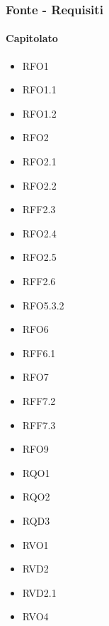 \subsubsection{Fonte - Requisiti}

\paragraph{Capitolato}
\quad
\begin{multicols}{3}
    \begin{itemize}
        \item RFO1
        \item RFO1.1
        \item RFO1.2
        \item RFO2
        \item RFO2.1
        \item RFO2.2
        \item RFF2.3
        \item RFO2.4
        \item RFO2.5
        \item RFF2.6
        \item RFO5.3.2
        \item RFO6
        \item RFF6.1
        \item RFO7
        \item RFF7.2
        \item RFF7.3
        \item RFO9
        \item RQO1
        \item RQO2
        \item RQD3
        \item RVO1
        \item RVD2
        \item RVD2.1
        \item RVO4
    \end{itemize}
\end{multicols}

